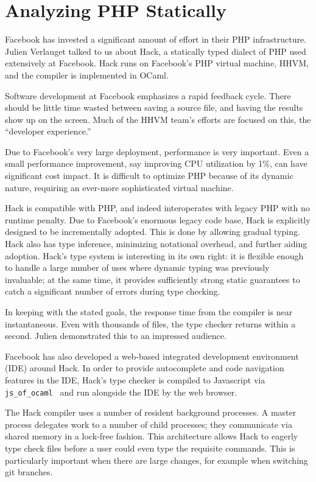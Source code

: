 \documentclass{jfp1}
\begin{document}
\section{Analyzing PHP Statically}


Facebook has invested a significant amount of effort in their PHP
infrastructure. Julien Verlauget talked to us about Hack, a statically
typed dialect of PHP used extensively at Facebook. Hack runs on
Facebook's PHP virtual machine, HHVM, and the compiler is implemented
in OCaml.

Software development at Facebook emphasizes a rapid feedback cycle.
There should be little time wasted between saving a source file, and
having the results show up on the screen. Much of the HHVM team's
efforts are focused on this, the ``developer experience.''

Due to Facebook's very large deployment, performance is very important.
Even a small performance improvement, say improving CPU utilization 
by 1\%, can have significant cost impact. It is difficult to optimize PHP
because of its dynamic nature, requiring an ever-more sophisticated 
virtual machine.

Hack is compatible with PHP, and indeed interoperates with legacy PHP
with no runtime penalty. Due to Facebook's enormous legacy code base, 
Hack is explicitly designed to be incrementally adopted. This is done
by allowing gradual typing. Hack also has type inference, minimizing
notational overhead, and further aiding adoption. Hack's type system
is interesting in its own right: it is flexible enough to handle a large
number of uses where dynamic typing was previously invaluable; at
the same time, it provides sufficiently strong static guarantees to catch
a significant number of errors during type checking.

In keeping with the stated goals, the response time from the compiler
is near instantaneous. Even with thousands of files, the type checker 
returns within a second. Julien demonstrated this to an impressed 
audience.

Facebook has also developed a web-based integrated development
environment (IDE) around Hack. In order to provide autocomplete and
code navigation features in the IDE, Hack's type checker is compiled 
to Javascript via \texttt{js\_of\_ocaml}~\cite{DBLP:journals/spe/VouillonB14} and run alongside the 
IDE by the web browser.

The Hack compiler uses a number of resident background processes. A
master process delegates work to a number of child processes; they
communicate via shared memory in a lock-free fashion. This
architecture allows Hack to eagerly type check files before a user
could even type the requisite commands. This is particularly important
when there are large changes, for example when switching git branches.
\end{document}
